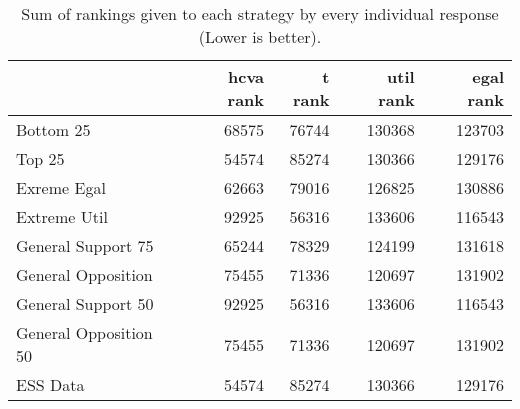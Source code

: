 \begin{table}
\caption{Sum of rankings given to each strategy by every individual response (Lower is better).}
\begin{tabular}{lrrrr}
\toprule
 & hcva rank & t rank & util rank & egal rank \\
\midrule
Bottom 25 & 68575 & 76744 & 130368 & 123703 \\
Top 25 & 54574 & 85274 & 130366 & 129176 \\
Exreme Egal & 62663 & 79016 & 126825 & 130886 \\
Extreme Util & 92925 & 56316 & 133606 & 116543 \\
General Support 75 & 65244 & 78329 & 124199 & 131618 \\
General Opposition & 75455 & 71336 & 120697 & 131902 \\
General Support 50 & 92925 & 56316 & 133606 & 116543 \\
General Opposition 50 & 75455 & 71336 & 120697 & 131902 \\
ESS Data & 54574 & 85274 & 130366 & 129176 \\
\bottomrule
\end{tabular}
\end{table}
